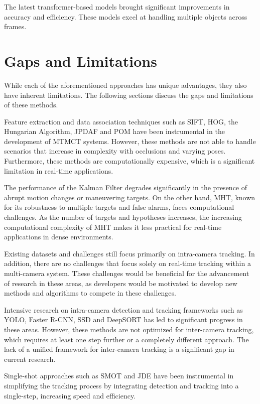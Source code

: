 The latest transformer-based models brought significant improvements in accuracy and efficiency. These models excel at handling multiple objects across frames.

\section{Gaps and Limitations}\label{sec:gaps_and_limitations}
While each of the aforementioned approaches has unique advantages, they also have inherent limitations. The following sections discuss the gaps and limitations of these methods.

Feature extraction and data association techniques such as SIFT, HOG, the Hungarian Algorithm, JPDAF and POM have been instrumental in the development of MTMCT systems. However, these methods are not able to handle scenarios that increase in complexity with occlusions and varying poses. Furthermore, these methods are computationally expensive, which is a significant limitation in real-time applications.

The performance of the Kalman Filter degrades significantly in the presence of abrupt motion changes or maneuvering targets. On the other hand, MHT, known for its robustness to multiple targets and false alarms, faces computational challenges. As the number of targets and hypotheses increases, the increasing computational complexity of MHT makes it less practical for real-time applications in dense environments.

Existing datasets and challenges still focus primarily on intra-camera tracking. In addition, there are no challenges that focus solely on real-time tracking within a multi-camera system. These challenges would be beneficial for the advancement of research in these areas, as developers would be motivated to develop new methods and algorithms to compete in these challenges.

Intensive research on intra-camera detection and tracking frameworks such as YOLO, Faster R-CNN, SSD and DeepSORT has led to significant progress in these areas. However, these methods are not optimized for inter-camera tracking, which requires at least one step further or a completely different approach. The lack of a unified framework for inter-camera tracking is a significant gap in current research.

Single-shot approaches such as SMOT and JDE have been instrumental in simplifying the tracking process by integrating detection and tracking into a single-step, increasing speed and efficiency.

